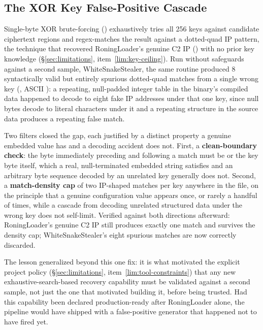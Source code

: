 \subsection{The XOR Key False-Positive Cascade}
\label{sec:case-xor}

Single-byte XOR brute-forcing () exhaustively
tries all 256 keys against candidate ciphertext regions and
regex-matches the result against a dotted-quad IP pattern, the
technique that recovered RoningLoader's genuine C2 IP
() with no prior key knowledge
(\S\ref{sec:limitations}, item~\ref{lim:key-ceiling}). Run without safeguards against a
second sample, WhiteSnakeStealer, the same routine produced 8
syntactically valid but entirely spurious dotted-quad matches from a
single wrong key (, ASCII ): a repeating,
null-padded integer table in the binary's compiled data happened to
decode to eight fake IP addresses under that one key, since null bytes
decode to literal  characters under it and a repeating
structure in the source data produces a repeating false match.

Two filters closed the gap, each justified by a distinct property a
genuine embedded value has and a decoding accident does not. First, a
\textbf{clean-boundary check}: the byte immediately preceding and
following a match must be  or the key byte itself, which a
real, null-terminated embedded string satisfies and an arbitrary byte
sequence decoded by an unrelated key generally does not. Second, a
\textbf{match-density cap} of two IP-shaped matches per key anywhere in
the file, on the principle that a genuine configuration value appears
once, or rarely a handful of times, while a cascade from decoding
unrelated structured data under the wrong key does not self-limit.
Verified against both directions afterward: RoningLoader's genuine C2
IP still produces exactly one match and survives the density cap;
WhiteSnakeStealer's eight spurious matches are now correctly discarded.

The lesson generalized beyond this one fix: it is what motivated the
explicit project policy (\S\ref{sec:limitations}, item~\ref{lim:tool-constraints}) that any new
exhaustive-search-based recovery capability must be validated against a
second sample, not just the one that motivated building it, before
being trusted. Had this capability been declared production-ready after
RoningLoader alone, the pipeline would have shipped with a
false-positive generator that happened not to have fired yet.

